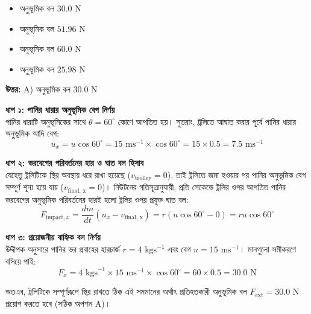 \documentclass[12pt, a4paper]{article}
\begin{document}
\begin{itemize}[label={}, leftmargin=1cm, itemsep=0.5em]
\item[\textbf{A)}] অনুভূমিক বল $30.0\text{ N}$
\item[\textbf{B)}] অনুভূমিক বল $51.96\text{ N}$
\item[\textbf{C)}] অনুভূমিক বল $60.0\text{ N}$
\item[\textbf{D)}] অনুভূমিক বল $25.98\text{ N}$
\end{itemize}

\vspace{0.5em}
\begin{tcolorbox}[answerbox]
\textbf{\color{success} উত্তর:} A) অনুভূমিক বল $30.0\text{ N}$
\end{tcolorbox}
\vspace{1em}

\begin{tcolorbox}[solutionbox={সমাধান (Solution)}]
\noindent
\textbf{ধাপ ১: পানির ধারার অনুভূমিক বেগ নির্ণয়} \\
পানির ধারাটি অনুভূমিকের সাথে $\theta = 60^\circ$ কোণে আপতিত হয়। সুতরাং, ট্রলিতে আঘাত করার পূর্বে পানির ধারার অনুভূমিক আদি বেগ:
\[ u_x = u \cos 60^\circ = 15\text{ ms}^{-1} \times \cos 60^\circ = 15 \times 0.5 = 7.5\text{ ms}^{-1} \]

\vspace{0.5em}
\noindent
\textbf{ধাপ ২: ভরবেগের পরিবর্তনের হার ও ঘাত বল হিসাব} \\
যেহেতু ট্রলিটিকে স্থির অবস্থায় ধরে রাখা হয়েছে ($v_{\text{trolley}} = 0$), তাই ট্রলিতে জমা হওয়ার পর পানির অনুভূমিক বেগ সম্পূর্ণ শূন্য হয়ে যায় ($v_{\text{final, x}} = 0$)। নিউটনের গতিসূত্রানুযায়ী, প্রতি সেকেন্ডে ট্রলির ওপর আপতিত পানির ভরবেগের অনুভূমিক পরিবর্তনের হারই হলো ট্রলির ওপর প্রযুক্ত ঘাত বল:
\[ F_{\text{impact}, x} = \frac{dm}{dt} (u_x - v_{\text{final, x}}) = r (u \cos 60^\circ - 0) = r u \cos 60^\circ \]

\vspace{0.5em}
\noindent
\textbf{ধাপ ৩: প্রয়োজনীয় বাহ্যিক বল নির্ণয়} \\
উদ্দীপক অনুসারে পানির ভর প্রবাহের হারচার্জ $r = 4\text{ kgs}^{-1}$ এবং বেগ $u = 15\text{ ms}^{-1}$। মানগুলো সমীকরণে বসিয়ে পাই:
\[ F_x = 4\text{ kgs}^{-1} \times 15\text{ ms}^{-1} \times \cos 60^\circ = 60 \times 0.5 = 30.0\text{ N} \]

অতএব, ট্রলিটিকে সম্পূর্ণরূপে স্থির রাখতে ঠিক এই সমমানের অর্থাৎ প্রতিহতকারী অনুভূমিক বল $F_{\text{ext}} = 30.0\text{ N}$ প্রয়োগ করতে হবে (সঠিক অপশন A)।
\end{tcolorbox}
\end{document}
